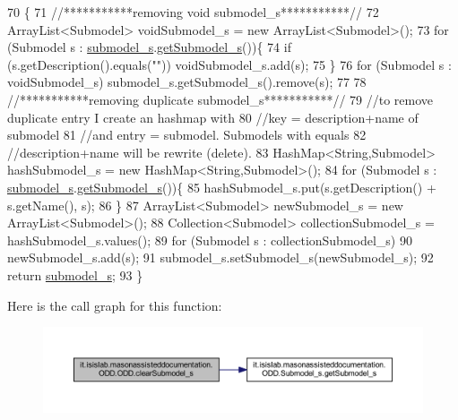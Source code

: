\begin{DoxyCode}
70                                                 \{
71         \textcolor{comment}{//***********removing void submodel\_s***********//}
72         ArrayList<Submodel> voidSubmodel\_s = \textcolor{keyword}{new} ArrayList<Submodel>();
73         \textcolor{keywordflow}{for} (Submodel s : \hyperlink{classit_1_1isislab_1_1masonassisteddocumentation_1_1_o_d_d_1_1_o_d_d_a828127e4a115a98ea6e6dba0a637c9ff}{submodel\_s}.\hyperlink{classit_1_1isislab_1_1masonassisteddocumentation_1_1_o_d_d_1_1_submodel__s_af835b4d42da6393b22f991b79ea32236}{getSubmodel\_s}())\{
74             \textcolor{keywordflow}{if} (s.getDescription().equals(\textcolor{stringliteral}{""}))  voidSubmodel\_s.add(s);
75         \}
76         \textcolor{keywordflow}{for} (Submodel s : voidSubmodel\_s)   submodel\_s.getSubmodel\_s().\textcolor{keyword}{remove}(s);
77         
78         \textcolor{comment}{//***********removing duplicate submodel\_s***********//}
79         \textcolor{comment}{//to remove duplicate entry I create an hashmap with }
80         \textcolor{comment}{//key = description+name of submodel}
81         \textcolor{comment}{//and entry = submodel. Submodels with equals }
82         \textcolor{comment}{//description+name will be rewrite (delete).}
83         HashMap<String,Submodel> hashSubmodel\_s = \textcolor{keyword}{new} HashMap<String,Submodel>();
84         \textcolor{keywordflow}{for} (Submodel s : \hyperlink{classit_1_1isislab_1_1masonassisteddocumentation_1_1_o_d_d_1_1_o_d_d_a828127e4a115a98ea6e6dba0a637c9ff}{submodel\_s}.\hyperlink{classit_1_1isislab_1_1masonassisteddocumentation_1_1_o_d_d_1_1_submodel__s_af835b4d42da6393b22f991b79ea32236}{getSubmodel\_s}())\{
85             hashSubmodel\_s.put(s.getDescription() + s.getName(), s);
86         \}
87         ArrayList<Submodel> newSubmodel\_s = \textcolor{keyword}{new} ArrayList<Submodel>();
88         Collection<Submodel> collectionSubmodel\_s = hashSubmodel\_s.values();
89         \textcolor{keywordflow}{for} (Submodel s : collectionSubmodel\_s)
90             newSubmodel\_s.add(s);
91         submodel\_s.setSubmodel\_s(newSubmodel\_s);
92         \textcolor{keywordflow}{return} \hyperlink{classit_1_1isislab_1_1masonassisteddocumentation_1_1_o_d_d_1_1_o_d_d_a828127e4a115a98ea6e6dba0a637c9ff}{submodel\_s};
93     \}
\end{DoxyCode}


Here is the call graph for this function\-:\nopagebreak
\begin{figure}[H]
\begin{center}
\leavevmode
\includegraphics[width=350pt]{classit_1_1isislab_1_1masonassisteddocumentation_1_1_o_d_d_1_1_o_d_d_a40cc43dbe2785cabf2ffc7adba8854ea_cgraph}
\end{center}
\end{figure}




